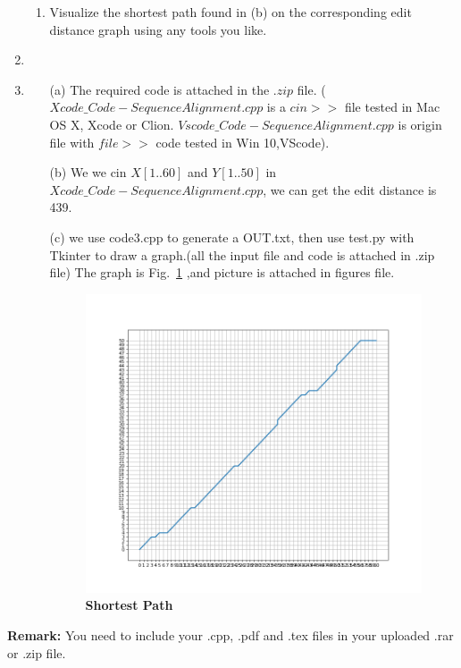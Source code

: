 \documentclass[12pt,a4paper]{article}
\makeatletter
\newtheorem*{solution}{Solution}
\theoremstyle{definition}
\renewenvironment{solution}[1][Solution] {\par\pushQED{\qed}\normalfont\topsep6\p@\@plus6\p@\relax\trivlist\item[\hskip\labelsep\bfseries#1\@addpunct{.}]\ignorespaces}{\popQED\endtrivlist\@endpefalse} \makeatother
\makeatother
\begin{document}
\begin{enumerate}
\begin{enumerate}
        \item
        {\color{red}{(Bonus)}} Visualize the shortest path found in (b) on the corresponding edit distance graph using any tools you like.
    \end{enumerate}
    \begin{solution}\item
    \renewcommand{\qedsymbol}{}
    \begin{itemize}
        \item [(a)] The required code is attached in the $.zip$ file. ($Xcode\_Code-SequenceAlignment.cpp$ is a \textbf{$cin>>$} file tested in Mac OS X, Xcode or Clion. $Vscode\_Code-SequenceAlignment.cpp$ is origin file with \textbf{$file>>$} code tested in Win 10,VScode).
        \item [(b)] We we cin $X[1..60]$ and $Y[1..50]$ in $Xcode\_Code-SequenceAlignment.cpp$, we can get the edit distance is 439.
        \item [(c)] we use code3.cpp to generate a OUT.txt, then use test.py with Tkinter to draw a graph.(all the input file and code is attached in .zip file) The graph is Fig.~\ref{Test} ,and picture is attached in figures file.
        \begin{figure}[htbp]
        \centering
        \includegraphics[width=1\textwidth]{figures/Figure_1.png}
        \caption{\textbf{Shortest Path}}\label{Test}
        \end{figure}
    \end{itemize}
    \end{solution}
\end{enumerate}

\vspace{20pt}

\textbf{Remark:} You need to include your .cpp, .pdf and .tex files in your uploaded .rar or .zip file.

\end{document}
